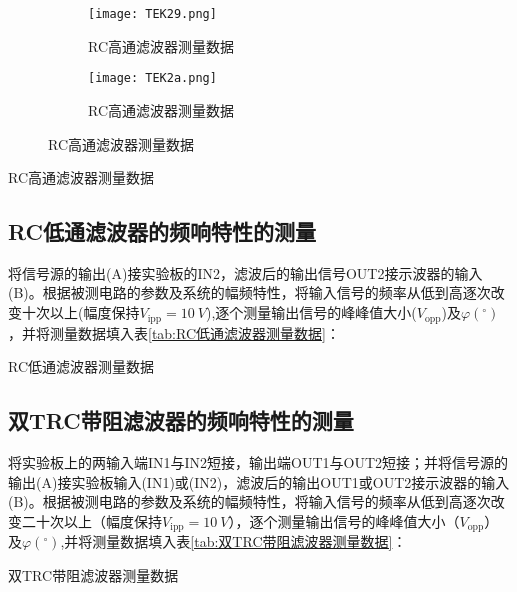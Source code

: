 \begin{figure}[htpb]
	\setcounter{sub}{\value{subfigure}}
	\begin{subfigure}[htpb]{.45\linewidth}
		\setcounter{subfigure}{\value{sub}}
		\centering
		\texttt{[image: TEK29.png]}
		\caption{RC高通滤波器测量数据}
		\label{fig:RC高通滤波器测量数据\arabic{subfigure}}
	\end{subfigure}
	\quad
	\begin{subfigure}[htpb]{.45\linewidth}
		\centering
		\texttt{[image: TEK2a.png]}
		\caption{RC高通滤波器测量数据}
		\label{fig:RC高通滤波器测量数据\arabic{subfigure}}
	\end{subfigure}
	\caption{RC高通滤波器测量数据}
	\label{fig:RC高通滤波器测量数据}
\end{figure}
\begin{table}[htpb]
	\centering
	\caption{RC高通滤波器测量数据}
	\label{tab:RC高通滤波器测量数据}
\end{table}
\subsection{RC低通滤波器的频响特性的测量}%
\label{sub:RC低通滤波器的频响特性的测量}
将信号源的输出(A)接实验板的IN2，滤波后的输出信号OUT2接示波器的输入(B)。根据被测电路的参数及系统的幅频特性，将输入信号的频率从低到高逐次改变十次以上(幅度保持$V_\text{ipp}=\SI{10}{V}$),逐个测量输出信号的峰峰值大小($V_\text{opp}$)及$\varphi(^{\circ})$，并将测量数据填入表\ref{tab:RC低通滤波器测量数据}：
\begin{table}[htpb]
	\centering
	\caption{RC低通滤波器测量数据}
	\label{tab:RC低通滤波器测量数据}
\end{table}
\subsection{双TRC带阻滤波器的频响特性的测量}%
\label{sub:双TRC带阻滤波器的频响特性的测量}
将实验板上的两输入端IN1与IN2短接，输出端OUT1与OUT2短接；并将信号源的输出(A)接实验板输入(IN1)或(IN2)，滤波后的输出OUT1或OUT2接示波器的输入(B)。根据被测电路的参数及系统的幅频特性，将输入信号的频率从低到高逐次改变二十次以上（幅度保持$ V_\text{ipp}=\SI{10}{V} $），逐个测量输出信号的峰峰值大小（$ V_\text{opp} $）及$ \varphi(^{\circ}) $,并将测量数据填入表\ref{tab:双TRC带阻滤波器测量数据}：
\begin{table}[htpb]
	\centering
	\caption{双TRC带阻滤波器测量数据}
	\label{tab:双TRC带阻滤波器测量数据}
\end{table}

